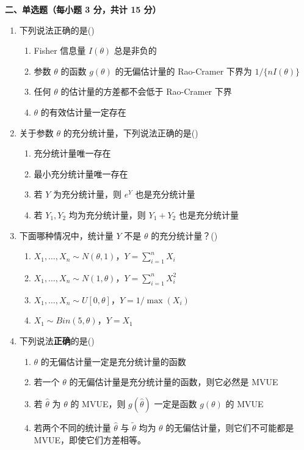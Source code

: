 \documentclass[12pt,a4paper]{ctexart}
\newcommand{\question}[1]{\bigskip\noindent\textbf{#1}\par\nobreak\medskip}
\begin{document}
\question{二、单选题（每小题 3 分，共计 15 分）}
\begin{enumerate}[label=\arabic*.,leftmargin=2.2em]
  \item 下列说法正确的是\hfill(\underline{\hspace{1.2cm}})
  \begin{enumerate}[label=\Alph*.,leftmargin=2.0em]
    \item Fisher 信息量 $I(\theta)$ 总是非负的
    \item 参数 $\theta$ 的函数 $g(\theta)$ 的无偏估计量的 Rao-Cramer 下界为 $1/\{nI(\theta)\}$
    \item 任何 $\theta$ 的估计量的方差都不会低于 Rao-Cramer 下界
    \item $\theta$ 的有效估计量一定存在
  \end{enumerate}

  \item 关于参数 $\theta$ 的充分统计量，下列说法正确的是\hfill(\underline{\hspace{1.2cm}})
  \begin{enumerate}[label=\Alph*.,leftmargin=2.0em]
    \item 充分统计量唯一存在
    \item 最小充分统计量唯一存在
    \item 若 $Y$ 为充分统计量，则 $e^{Y}$ 也是充分统计量
    \item 若 $Y_{1},Y_{2}$ 均为充分统计量，则 $Y_{1}+Y_{2}$ 也是充分统计量
  \end{enumerate}

  \item 下面哪种情况中，统计量 $Y$ 不是 $\theta$ 的充分统计量？\hfill(\underline{\hspace{1.2cm}})
  \begin{enumerate}[label=\Alph*.,leftmargin=2.0em]
    \item $X_{1},\ldots,X_{n}\sim N(\theta,1)$，$Y=\sum_{i=1}^{n}X_{i}$
    \item $X_{1},\ldots,X_{n}\sim N(1,\theta)$，$Y=\sum_{i=1}^{n}X_{i}^{2}$
    \item $X_{1},\ldots,X_{n}\sim U[0,\theta]$，$Y=1/\max(X_{i})$
    \item $X_{1}\sim Bin(5,\theta)$，$Y=X_{1}$
  \end{enumerate}

  \item 下列说法\textbf{正确}的是\hfill(\underline{\hspace{1.2cm}})
  \begin{enumerate}[label=\Alph*.,leftmargin=2.0em]
    \item $\theta$ 的无偏估计量一定是充分统计量的函数
    \item 若一个 $\theta$ 的无偏估计量是充分统计量的函数，则它必然是 MVUE
    \item 若 $\widehat{\theta}$ 为 $\theta$ 的 MVUE，则 $g(\widehat{\theta})$ 一定是函数 $g(\theta)$ 的 MVUE
    \item 若两个不同的统计量 $\widehat{\theta}$ 与 $\widetilde{\theta}$ 均为 $\theta$ 的无偏估计量，则它们不可能都是 MVUE，即使它们方差相等。
  \end{enumerate}


\end{enumerate}
\end{document}
